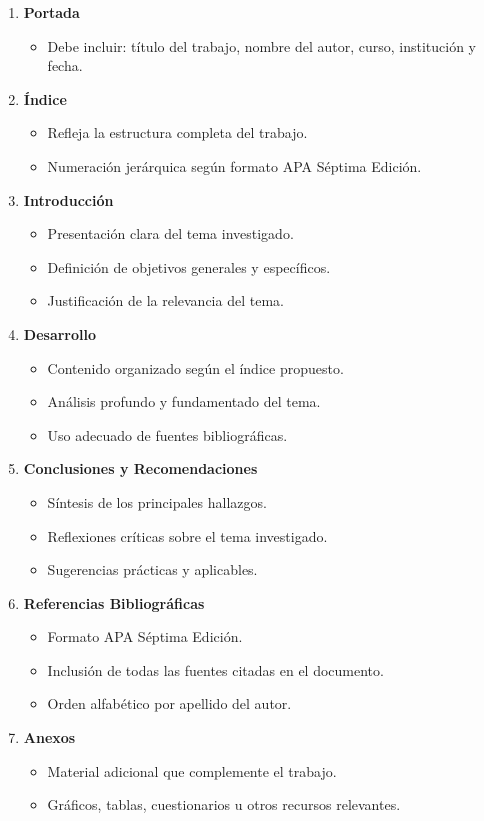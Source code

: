 \documentclass[12pt,a4paper]{article}
\begin{document}
\begin{enumerate}
  \item \textbf{Portada}
  \begin{itemize}
    \item Debe incluir: título del trabajo, nombre del autor, curso, institución y fecha.
  \end{itemize}
  
  \item \textbf{Índice}
  \begin{itemize}
    \item Refleja la estructura completa del trabajo.
    \item Numeración jerárquica según formato APA Séptima Edición.
  \end{itemize}
  
  \item \textbf{Introducción}
  \begin{itemize}
    \item Presentación clara del tema investigado.
    \item Definición de objetivos generales y específicos.
    \item Justificación de la relevancia del tema.
  \end{itemize}
  
  \item \textbf{Desarrollo}
  \begin{itemize}
    \item Contenido organizado según el índice propuesto.
    \item Análisis profundo y fundamentado del tema.
    \item Uso adecuado de fuentes bibliográficas.
  \end{itemize}
  
  \item \textbf{Conclusiones y Recomendaciones}
  \begin{itemize}
    \item Síntesis de los principales hallazgos.
    \item Reflexiones críticas sobre el tema investigado.
    \item Sugerencias prácticas y aplicables.
  \end{itemize}
  
  \item \textbf{Referencias Bibliográficas}
  \begin{itemize}
    \item Formato APA Séptima Edición.
    \item Inclusión de todas las fuentes citadas en el documento.
    \item Orden alfabético por apellido del autor.
  \end{itemize}
  
  \item \textbf{Anexos}
  \begin{itemize}
    \item Material adicional que complemente el trabajo.
    \item Gráficos, tablas, cuestionarios u otros recursos relevantes.
  \end{itemize}
\end{enumerate}
\end{document}
